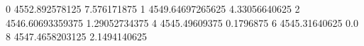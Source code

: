 0 4552.892578125 7.576171875
1 4549.64697265625 4.33056640625
2 4546.60693359375 1.29052734375
4 4545.49609375 0.1796875
6 4545.31640625 0.0
8 4547.4658203125 2.1494140625
